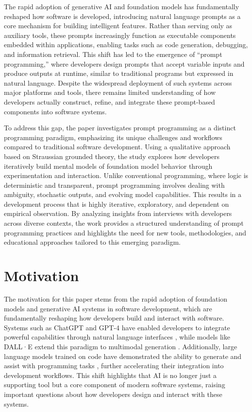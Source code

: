 The rapid adoption of generative AI and foundation models has fundamentally reshaped how software is developed, introducing natural language prompts as a core mechanism for building intelligent features. Rather than serving only as auxiliary tools, these prompts increasingly function as executable components embedded within applications, enabling tasks such as code generation, debugging, and information retrieval. This shift has led to the emergence of “prompt programming,” where developers design prompts that accept variable inputs and produce outputs at runtime, similar to traditional programs but expressed in natural language. Despite the widespread deployment of such systems across major platforms and tools, there remains limited understanding of how developers actually construct, refine, and integrate these prompt-based components into software systems.

To address this gap, the paper investigates prompt programming as a distinct programming paradigm, emphasizing its unique challenges and workflows compared to traditional software development. Using a qualitative approach based on Straussian grounded theory, the study explores how developers iteratively build mental models of foundation model behavior through experimentation and interaction. Unlike conventional programming, where logic is deterministic and transparent, prompt programming involves dealing with ambiguity, stochastic outputs, and evolving model capabilities. This results in a development process that is highly iterative, exploratory, and dependent on empirical observation. By analyzing insights from interviews with developers across diverse contexts, the work provides a structured understanding of prompt programming practices and highlights the need for new tools, methodologies, and educational approaches tailored to this emerging paradigm.

\section{Motivation}
The motivation for this paper stems from the rapid adoption of foundation models and generative AI systems in software development, which are fundamentally reshaping how developers build and interact with software. Systems such as ChatGPT and GPT-4 have enabled developers to integrate powerful capabilities through natural language interfaces \cite{chatgpt,gpt4}, while models like DALL·E extend this paradigm to multimodal generation \cite{dalle3}. Additionally, large language models trained on code have demonstrated the ability to generate and assist with programming tasks \cite{codex}, further accelerating their integration into development workflows. This shift highlights that AI is no longer just a supporting tool but a core component of modern software systems, raising important questions about how developers design and interact with these systems.

